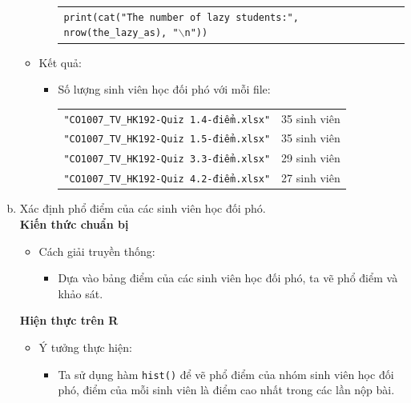 \documentclass[a4paper]{article}
\theoremstyle{definition}
\begin{document}
\begin{enumerate}[a)]
\begin{itemize}
\begin{itemize}
            \begin{center}
                \begin{tabular}{p{13cm}}
                    \texttt{print(cat("The number of lazy students:", nrow(the\_lazy\_as), "$\backslash$n"))}
                \end{tabular}
            \end{center}
        \end{itemize}
        \item Kết quả:
        \begin{itemize}
            \item Số lượng sinh viên học đối phó với mỗi file:
            \begin{center}
                \begin{tabular}{l l}
                     \texttt{"CO1007\_TV\_HK192-Quiz 1.4-điểm.xlsx"} & 35 sinh viên\\ 
                     \texttt{"CO1007\_TV\_HK192-Quiz 1.5-điểm.xlsx"} & 35 sinh viên\\ 
                     \texttt{"CO1007\_TV\_HK192-Quiz 3.3-điểm.xlsx"} & 29 sinh viên\\ 
                     \texttt{"CO1007\_TV\_HK192-Quiz 4.2-điểm.xlsx"} & 27 sinh viên\\ 
                \end{tabular}
            \end{center}
        \end{itemize}
    \end{itemize}
    \item Xác định phổ điểm của các sinh viên học đối phó.\\[6pt]
    \bf Kiến thức chuẩn bị\normalfont
    \begin{itemize}
        \item Cách giải truyền thống:
        \begin{itemize}
            \item Dựa vào bảng điểm của các sinh viên học đối phó, ta vẽ phổ điểm và khảo sát.
        \end{itemize}
    \end{itemize}
    \bf Hiện thực trên R\normalfont
    \begin{itemize}
        \item Ý tưởng thực hiện:
        \begin{itemize}
            \item Ta sử dụng hàm \texttt{hist()} để vẽ phổ điểm của nhóm sinh viên học đối phó, điểm của mỗi sinh viên là điểm cao nhất trong các lần nộp bài.

\end{itemize}
\end{itemize}
\end{enumerate}
\end{document}
